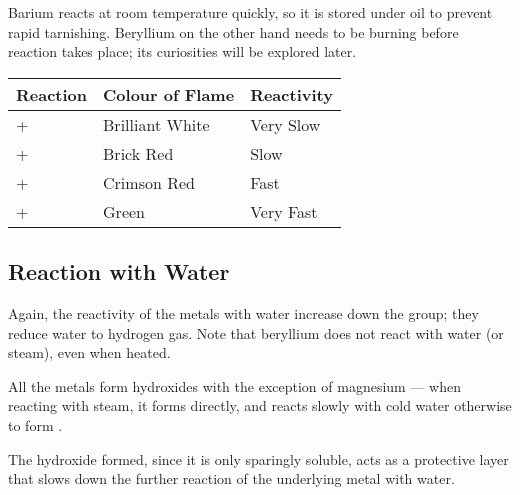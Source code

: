 			Barium reacts at room temperature quickly, so it is stored under oil to prevent rapid tarnishing. Beryllium on the other hand needs
			to be burning before  reaction takes place; its curiosities will be explored later.


			\begin{center}\begin{table}[htb]\renewcommand{\arraystretch}{1.5}
			\begin{tabu} to \textwidth {X[-4,c,m] | X[c,m] | X[c,m]}

				Reaction									&	Colour of Flame		&	Reactivity	\\	\hline
				 + 	&	Brilliant White		& 	Very Slow	\\	\hline
				 + 	&	Brick Red			& 	Slow		\\	\hline
				 + 	&	Crimson Red			& 	Fast		\\	\hline
				 + 	&	Green				& 	Very Fast	\\	\hline

			\end{tabu}
			\end{table}\end{center}\vspace{-10mm}



		\pagebreak
		\subsection{Reaction with Water}

			Again, the reactivity of the metals with water increase down the group; they reduce water to
			hydrogen gas. Note that beryllium does not react with water (or steam), even when heated.

			All the metals form hydroxides with the exception of magnesium --- when reacting with steam,
			it forms  directly, and reacts slowly with cold water otherwise to form .


			The hydroxide formed, since it is only sparingly soluble, acts as a protective layer that slows down the further reaction of
			the underlying metal with water.

